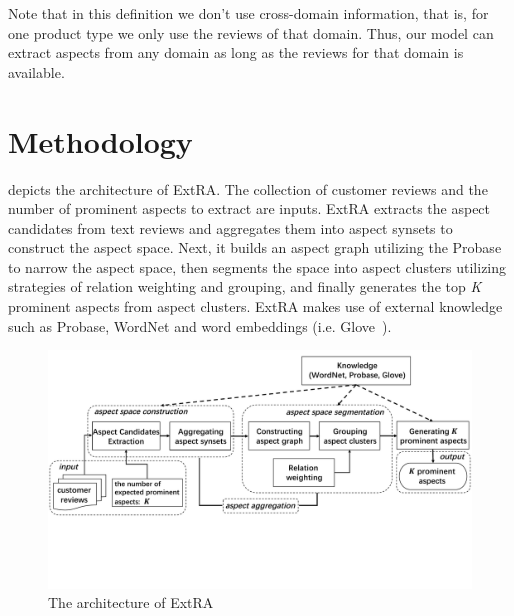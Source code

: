 Note that in this definition we don't use cross-domain information, 
that is, for one product type we only use the reviews of that domain.
Thus, our model can extract aspects from any domain as long as the reviews for that domain is available.

\section{Methodology}
 depicts the architecture of ExtRA.
The collection of customer reviews and the
number of prominent aspects to extract are inputs.
ExtRA extracts the aspect candidates from text reviews and
aggregates them into aspect synsets to construct the aspect space.
Next, it builds an aspect graph utilizing the Probase to narrow the aspect space, then segments the space into aspect clusters 
utilizing strategies of relation weighting and grouping,
and finally generates the top \emph{K} prominent aspects from aspect clusters.
ExtRA makes use of external knowledge such as Probase, WordNet and word embeddings (i.e. Glove~\cite{pennington2014glove}).

\begin{figure}[th!]
	\centering
	\includegraphics[width=0.95\columnwidth]{figures/nflow}
	\caption{The architecture of ExtRA}
	\label{fig:flow}
\end{figure}

